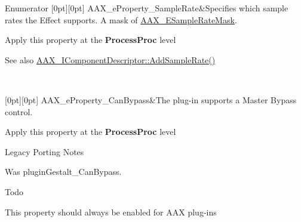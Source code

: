 \begin{DoxyEnumFields}{Enumerator}
[0pt][0pt]{}\mbox{\label{a00662_a13e384f22825afd3db6d68395b79ce0dac5294e2feb18587d57b6ca0216a6bb1e}} 
A\+A\+X\+\_\+e\+Property\+\_\+\+Sample\+Rate&Specifies which sample rates the Effect supports. A mask of \mbox{\hyperlink{a00491_a5bb98259de21d2c4d04a2d6010d757c7}{A\+A\+X\+\_\+\+E\+Sample\+Rate\+Mask}}. \begin{DoxyItemize}
\item Apply this property at the {\bfseries{Process\+Proc}} level\end{DoxyItemize}
\begin{DoxySeeAlso}{See also}
\mbox{\hyperlink{a01781_adbd57beaa0a3143d3cf44b93ecdb59ec}{A\+A\+X\+\_\+\+I\+Component\+Descriptor\+::\+Add\+Sample\+Rate()}} 
\end{DoxySeeAlso}
\\
\hline

[0pt][0pt]{}\mbox{\label{a00662_a13e384f22825afd3db6d68395b79ce0da6819867a9e86913e59decf318416d755}} 
A\+A\+X\+\_\+e\+Property\+\_\+\+Can\+Bypass&The plug-\/in supports a Master Bypass control. \begin{DoxyItemize}
\item Apply this property at the {\bfseries{Process\+Proc}} level\end{DoxyItemize}
\begin{DoxyRefDesc}{Legacy Porting Notes}
\item[\mbox{\hyperlink{a00787__porting_notes000046}{Legacy Porting Notes}}]Was plugin\+Gestalt\+\_\+\+Can\+Bypass.\end{DoxyRefDesc}


\begin{DoxyRefDesc}{Todo}
\item[\mbox{\hyperlink{a00785__todo000051}{Todo}}]This property should always be enabled for A\+AX plug-\/ins \end{DoxyRefDesc}
\\
\hline


\end{DoxyEnumFields}
